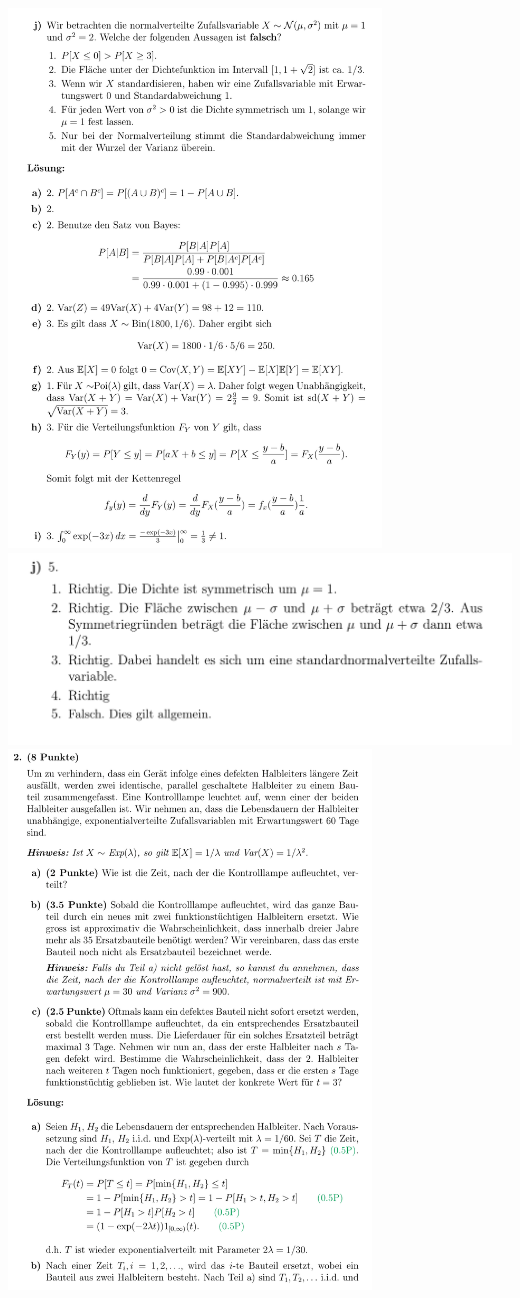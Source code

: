 \includegraphics[height=143mm]{old_exams_prtsrc/sch_infk_so19_ml-03.png}\newline
\includegraphics[width=0.8\linewidth]{old_exams_prtsrc/sch_infk_so19_ml-04.png}\newline
\includegraphics[height=143mm]{old_exams_prtsrc/sch_infk_so19_ml-05.png}\newline
